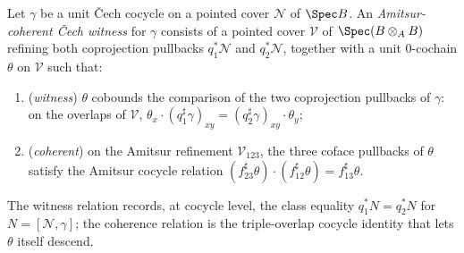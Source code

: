 \begin{definition}
  \label{pa-def:CoherentCechWitness}
  \leanok

  Let \(\gamma\) be a unit \v Cech cocycle on a pointed cover \(\mathcal N\) of \(\Spec B\). An
  \emph{Amitsur-coherent \v Cech witness} for \(\gamma\) consists of a pointed cover
  \(\mathcal V\) of \(\Spec(B \otimes_A B)\) refining both coprojection pullbacks
  \(q_1^{*}\mathcal N\) and \(q_2^{*}\mathcal N\), together with a unit \(0\)-cochain
  \(\theta\) on \(\mathcal V\) such that:
  \begin{enumerate}
    \item (\emph{witness}) \(\theta\) cobounds the comparison of the two coprojection pullbacks
      of \(\gamma\): on the overlaps of \(\mathcal V\),
      \(\theta_x \cdot (q_1^{\sharp}\gamma)_{xy} = (q_2^{\sharp}\gamma)_{xy} \cdot \theta_y\);
    \item (\emph{coherent}) on the Amitsur refinement \(\mathcal V_{123}\), the three coface
      pullbacks of \(\theta\) satisfy the Amitsur cocycle relation
      \((f_{23}^{\sharp}\theta) \cdot (f_{12}^{\sharp}\theta) = f_{13}^{\sharp}\theta\).
  \end{enumerate}
  The witness relation records, at cocycle level, the class equality
  \(q_1^{*} N = q_2^{*} N\) for \(N = [\mathcal N, \gamma]\); the coherence relation is the
  triple-overlap cocycle identity that lets \(\theta\) itself descend.
\end{definition}

